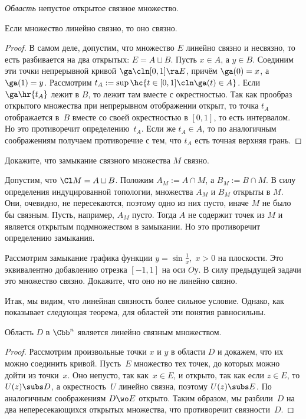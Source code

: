 \documentclass[a4paper]{article}
\begin{document}
\begin{df}
\emph{Область} непустое открытое связное множество.
\end{df}

\begin{stm}
Если множество линейно связно, то оно связно.
\end{stm}
\begin{proof}
В самом деле, допустим, что множество $E$ линейно связно и несвязно, то есть разбивается на два открытых: $E = A \sqcup B$.
Пусть $x \in A$, а $y \in B$. Соединим эти точки непрерывной кривой $\ga\cln[0,1]\ra E$, причём $\ga(0)=x$, а $\ga(1)=y$.
Рассмотрим $t_A := \sup\hc{t \in [0,1] \cln \ga(t) \in A}$. Если $\ga\hr{t_A}$ лежит в $B$, то лежит там вместе с
окрестностью. Так как прообраз открытого множества при непрерывном отображении открыт, то точка $t_A$
отображается в~$B$ вместе со своей окрестностью в $[0,1]$, то есть интервалом. Но это противоречит определению~$t_A$.
Если же $t_A \in A$, то по аналогичным соображениям получаем противоречие с тем, что $t_A$ есть точная верхняя грань.
\end{proof}

\begin{problem}
Докажите, что замыкание связного множества $M$ связно.
\end{problem}
\begin{solution}
Допустим, что $\Cl M = A \sqcup B$. Положим $A_M := A \cap M$, а $B_M := B \cap M$.
В силу определения индуцированной топологии, множества $A_M$ и $B_M$ открыты в $M$.
Они, очевидно, не пересекаются, поэтому одно из них пусто, иначе $M$ не было бы связным.
Пусть, например, $A_M$ пусто. Тогда $A$ не содержит точек из $M$ и является открытым подмножеством
в замыкании. Но это противоречит определению замыкания.
\end{solution}


\begin{problem}
Рассмотрим замыкание графика функции $y = \sin \frac{1}{x},\; x > 0$ на плоскости. Это эквивалентно
добавлению отрезка $[-1,1]$ на оси $Oу$. В силу предыдущей задачи это множество связно.
Докажите, что оно но не линейно связно.
\end{problem}

Итак, мы видим, что линейная связность более сильное условие. Однако, как показывает
следующая теорема, для областей эти понятия равносильны.

\begin{theorem}
Область $D$ в $\Cbb^n$ является линейно связным множеством.
\end{theorem}
\begin{proof}
Рассмотрим произвольные точки $x$ и $y$ в области $D$ и докажем, что их можно соединить кривой.
Пусть~$E$ множество тех точек, до которых можно дойти из точки~$x$. Оно непусто, так как~${x \in E}$, и открыто,
так как если ${z \in E}$, то $U(z) \subs D$, а окрестность~$U$ линейно связна, поэтому $U(z) \subs E$. По
аналогичным соображениям $D \wo E$ открыто. Таким образом, мы разбили~$D$ на два
непересекающихся открытых множества, что противоречит связности~$D$.
\end{proof}
\end{document}
